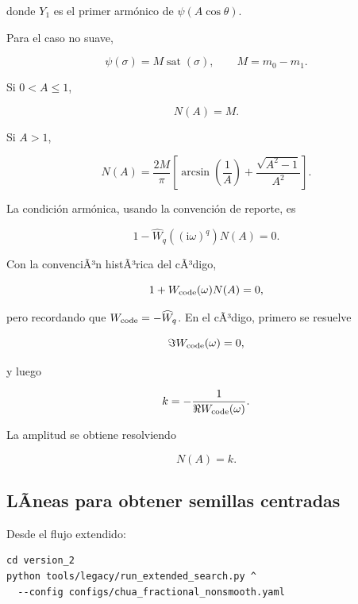\documentclass[11pt]{article}
\newcommand{\ii}{\mathrm{i}}
\begin{document}
donde \(Y_1\) es el primer armónico de \(\psi(A\cos\theta)\).

Para el caso no suave,

\begin{equation}
\psi(\sigma)=M\operatorname{sat}(\sigma),
\qquad
M=m_0-m_1.
\end{equation}

Si \(0<A\leq 1\),

\begin{equation}
N(A)=M.
\end{equation}

Si \(A>1\),

\begin{equation}
N(A)=\frac{2M}{\pi}
\left[
\arcsin\left(\frac{1}{A}\right)
+
\frac{\sqrt{A^2-1}}{A^2}
\right].
\end{equation}

La condición armónica, usando la convención de reporte, es

\begin{equation}
1-\widehat W_q((\ii\omega)^q)N(A)=0.
\end{equation}

Con la convenciÃ³n histÃ³rica del cÃ³digo,

\begin{equation}
1+W_{\rm code}(\omega)N(A)=0,
\end{equation}

pero recordando que \(W_{\rm code}=-\widehat W_q\). En el cÃ³digo, primero se resuelve

\begin{equation}
\Im W_{\rm code}(\omega)=0,
\end{equation}

y luego

\begin{equation}
k=-\frac{1}{\Re W_{\rm code}(\omega)}.
\end{equation}

La amplitud se obtiene resolviendo

\begin{equation}
N(A)=k.
\end{equation}

\subsection{LÃ­neas para obtener semillas centradas}

Desde el flujo extendido:

\begin{lstlisting}
cd version_2
python tools/legacy/run_extended_search.py ^
  --config configs/chua_fractional_nonsmooth.yaml
\end{lstlisting}
\end{document}
